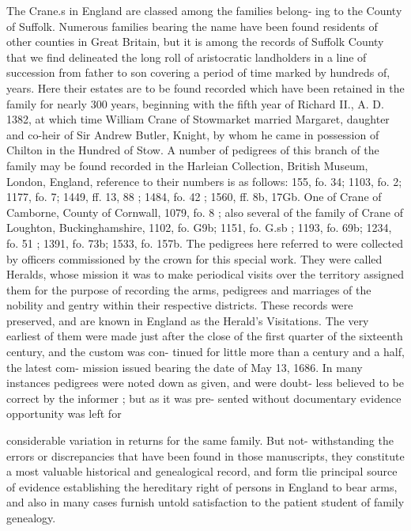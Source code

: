 \documentclass{book}
\begin{document}
The Crane.s in England are classed among the families belong- 
ing to the County of Suffolk. Numerous families bearing the 
name have been found residents of other counties in Great 
Britain, but it is among the records of Suffolk County that we 
find delineated the long roll of aristocratic landholders in a line 
of succession from father to son covering a period of time marked 
by hundreds of, years. Here their estates are to be found recorded 
which have been retained in the family for nearly 300 years, 
beginning with the fifth year of Richard II., A. D. 1382, at 
which time William Crane of Stowmarket married Margaret, 
daughter and co-heir of Sir Andrew Butler, Knight, by whom he 
came in possession of Chilton in the Hundred of Stow. A number 
of pedigrees of this branch of the family may be found recorded 
in the Harleian Collection, British Museum, London, England, 
reference to their numbers is as follows: 155, fo. 34; 1103, fo. 
2; 1177, fo. 7; 1449, ff. 13, 88 ; 1484, fo. 42 ; 1560, ff. 8b, 17Gb. 
One of Crane of Camborne, County of Cornwall, 1079, fo. 8 ; also 
several of the family of Crane of Loughton, Buckinghamshire, 
1102, fo. G9b; 1151, fo. G.sb ; 1193, fo. 69b; 1234, fo. 51 ; 1391, 
fo. 73b; 1533, fo. 157b. The pedigrees here referred to were 
collected by officers commissioned by the crown for this special 
work. They were called Heralds, whose mission it was to make 
periodical visits over the territory assigned them for the purpose 
of recording the arms, pedigrees and marriages of the nobility 
and gentry within their respective districts. These records were 
preserved, and are known in England as the Herald's Visitations. 
The very earliest of them were made just after the close of the 
first quarter of the sixteenth century, and the custom was con- 
tinued for little more than a century and a half, the latest com- 
mission issued bearing the date of May 13, 1686. In many 
instances pedigrees were noted down as given, and were doubt- 
less believed to be correct by the informer ; but as it was pre- 
sented without documentary evidence opportunity was left for 




considerable variation in returns for the same family. But not- 
withstanding the errors or discrepancies that have been found in 
those manuscripts, they constitute a most valuable historical and 
genealogical record, and form tlie principal source of evidence 
establishing the hereditary right of persons in England to bear 
arms, and also in many cases furnish untold satisfaction to the 
patient student of family genealogy. 
\end{document}
